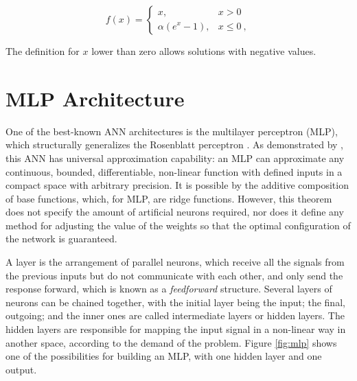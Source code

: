 \begin{equation}
	\label{eq:elu}
	f(x) = \left\{\begin{matrix}
		x,               & x > 0    \\
		\alpha(e^x - 1), & x \leq 0 \:,
	\end{matrix}\right.
\end{equation}

The definition for $x$ lower than zero allows solutions with negative values.


\section{MLP Architecture}
\label{sec:mlp}

One of the best-known ANN architectures is the multilayer perceptron (MLP), which structurally generalizes the Rosenblatt perceptron \cite{Rosenblatt1958}. As demonstrated by \cite{Cybenko1989}, this ANN has universal approximation capability: an MLP can approximate any continuous, bounded, differentiable, non-linear function with defined inputs in a compact space with arbitrary precision. It is possible by the additive composition of base functions, which, for MLP, are ridge functions. However, this theorem does not specify the amount of artificial neurons required, nor does it define any method for adjusting the value of the weights so that the optimal configuration of the network is guaranteed.

A layer is the arrangement of parallel neurons, which receive all the signals from the previous inputs but do not communicate with each other, and only send the response forward, which is known as a \textit{feedforward} structure. Several layers of neurons can be chained together, with the initial layer being the input; the final, outgoing; and the inner ones are called intermediate layers or hidden layers. The hidden layers are responsible for mapping the input signal in a non-linear way in another space, according to the demand of the problem. Figure \ref{fig:mlp} shows one of the possibilities for building an MLP, with one hidden layer and one output.

